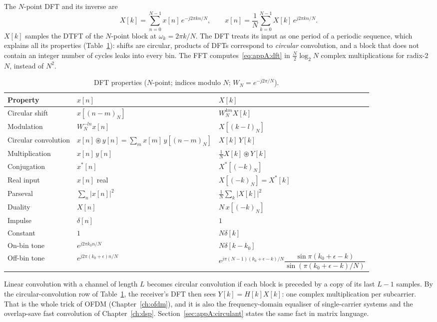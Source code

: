 The $N$-point DFT and its inverse are
\begin{equation}
X[k]=\sum_{n=0}^{N-1}x[n]\,e^{-j2\pi kn/N},\qquad
x[n]=\frac1N\sum_{k=0}^{N-1}X[k]\,e^{j2\pi kn/N}.
\label{eq:appA:dft}
\end{equation}
$X[k]$ samples the DTFT of the $N$-point block at $\omega_k=2\pi k/N$. The DFT treats its input as
one period of a periodic sequence, which explains all its properties
(Table~\ref{tab:appA:dft}): shifts are circular, products of DFTs correspond to
\emph{circular} convolution, and a block that does not contain an integer number of cycles
leaks into every bin. The FFT computes~\eqref{eq:appA:dft} in $\tfrac N2\log_2N$ complex
multiplications for radix-2 $N$, instead of $N^2$.

\begin{table}[htbp]\centering\small
\caption{DFT properties ($N$-point; indices modulo $N$; $W_N=e^{-j2\pi/N}$).}\label{tab:appA:dft}
\begin{tabular}{@{}lll@{}}
\toprule
Property & $x[n]$ & $X[k]$\\
\midrule
Circular shift & $x[(n-m)_N]$ & $W_N^{km}X[k]$\\
Modulation & $W_N^{-ln}x[n]$ & $X[(k-l)_N]$\\
Circular convolution & $x[n]\circledast y[n]=\sum_m x[m]\,y[(n-m)_N]$ & $X[k]\,Y[k]$\\
Multiplication & $x[n]\,y[n]$ & $\frac1N X[k]\circledast Y[k]$\\
Conjugation & $x^*[n]$ & $X^*[(-k)_N]$\\
Real input & $x[n]$ real & $X[(-k)_N]=X^*[k]$\\
Parseval & $\sum_n|x[n]|^2$ & $\frac1N\sum_k|X[k]|^2$\\
Duality & $X[n]$ & $N\,x[(-k)_N]$\\
\midrule
Impulse & $\delta[n]$ & $1$\\
Constant & $1$ & $N\delta[k]$\\
On-bin tone & $e^{j2\pi k_0n/N}$ & $N\delta[k-k_0]$\\
Off-bin tone & $e^{j2\pi(k_0+\epsilon)n/N}$ & $e^{j\pi(N-1)(k_0+\epsilon-k)/N}\dfrac{\sin\pi(k_0+\epsilon-k)}{\sin(\pi(k_0+\epsilon-k)/N)}$\\
\bottomrule
\end{tabular}
\end{table}

\begin{keyidea}
Linear convolution with a channel of length $L$ becomes circular convolution if each block is
preceded by a copy of its last $L-1$ samples. By the circular-convolution row of
Table~\ref{tab:appA:dft}, the receiver's DFT then sees $Y[k]=H[k]X[k]$: one complex
multiplication per subcarrier. That is the whole trick of OFDM (Chapter~\ref{ch:ofdm}), and it
is also the frequency-domain equaliser of single-carrier systems and the overlap-save fast
convolution of Chapter~\ref{ch:dsp}. Section~\ref{sec:appA:circulant} states the same fact in
matrix language.
\end{keyidea}

